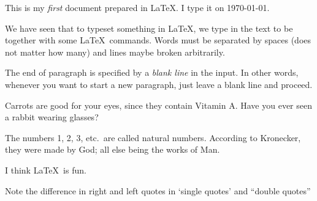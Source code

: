 \documentclass{article}
\begin{document}
This is my \emph{first} document prepared in \LaTeX. I type it on \today.

We have seen that to typeset something in \LaTeX, we type in the text to be
together with some \LaTeX\ commands.
Words must be separated by spaces (does not matter how many)
and lines maybe broken arbitrarily.

\noindent The end of paragraph is specified by a \emph{blank line}
in the input. In other words, whenever you want to start a new
paragraph, just leave a blank line and proceed.

Carrots are good for your eyes, since they contain Vitamin A\@. Have
you ever seen a rabbit wearing glasses?

The numbers 1, 2, 3, etc.\ are called natural numbers. According to
Kronecker, they were made by God; all else being the works of Man.

I think \LaTeX\ is fun.

Note the difference in right and left quotes in `single quotes' and ``double quotes''
\end{document}
